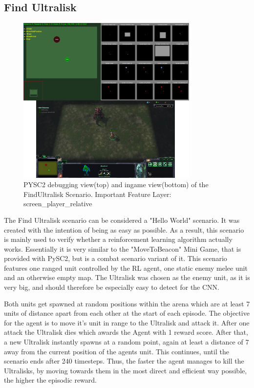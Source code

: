 \subsection{Find Ultralisk}
\begin{figure}[htb]
  \centering
      \includegraphics[width=0.8\textwidth]{Figures/FindUltralisk.png}
  \caption{PYSC2 debugging view(top) and ingame view(bottom) of the FindUltralisk Scenario. Important Feature Layer: screen\_player\_relative }
\end{figure}
The Find Ultralisk scenario can be considered a "Hello World" scenario. It was created with the intention of being as easy as possible. As a result, this scenario is mainly used to verify whether a reinforcement learning algorithm actually works. Essentially it is very similar to the "MoveToBeacon" Mini Game, that is provided with PySC2, but is a combat scenario variant of it. This scenario features one ranged unit controlled by the RL agent, one static enemy melee unit and an otherwise empty map. The Ultralisk was chosen as the enemy unit, as it is very big, and should therefore be especially easy to detect for the CNN.

Both units get spawned at random positions within the arena which are at least 7 units of distance apart from each other at the start of each episode.
The objective for the agent is to move it's unit in range to the Ultralisk and attack it. After one attack the Ultralisk dies which awards the Agent with 1 reward score.
After that, a new Ultralisk instantly spawns at a random point, again at least a distance of 7 away from the current position of the agents unit. This continues, until the scenario ends after 240 timesteps. Thus, the faster the agent manages to kill the Ultralisks, by moving towards them in the most direct and efficient way possible, the higher the episodic reward.

